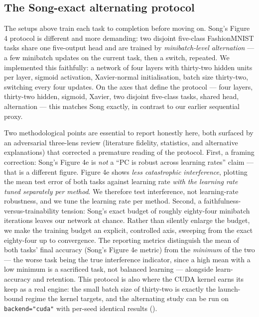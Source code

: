 \subsection{The Song-exact alternating protocol}

The setups above train each task to completion before moving on. Song's Figure 4 protocol is different
and more demanding: two disjoint five-class FashionMNIST tasks share one five-output head and are
trained by \emph{minibatch-level alternation} --- a few minibatch updates on the current task, then a
switch, repeated. We implemented this faithfully: a network of four layers with thirty-two hidden units
per layer, sigmoid activation, Xavier-normal initialisation, batch size thirty-two, switching every four
updates. On the axes that define the protocol --- four layers, thirty-two hidden, sigmoid, Xavier, two
disjoint five-class tasks, shared head, alternation --- this matches Song exactly, in contrast to our
earlier sequential proxy.

Two methodological points are essential to report honestly here, both surfaced by an adversarial
three-lens review (literature fidelity, statistics, and alternative explanations) that corrected a
premature reading of the protocol. First, a framing correction: Song's Figure 4e is \emph{not} a
``PC is robust across learning rates'' claim --- that is a different figure. Figure 4e shows \emph{less
catastrophic interference}, plotting the mean test error of both tasks against learning rate \emph{with
the learning rate tuned separately per method}. We therefore test interference, not learning-rate
robustness, and we tune the learning rate per method. Second, a faithfulness-versus-trainability
tension: Song's exact budget of roughly eighty-four minibatch iterations leaves our network at chance.
Rather than silently enlarge the budget, we make the training budget an explicit, controlled axis,
sweeping from the exact eighty-four up to convergence. The reporting metrics distinguish the mean of
both tasks' final accuracy (Song's Figure 4e metric) from the \emph{minimum} of the two --- the worse
task being the true interference indicator, since a high mean with a low minimum is a sacrificed task,
not balanced learning --- alongside learn-accuracy and retention. This protocol is also where the CUDA
kernel earns its keep as a real engine: the small batch size of thirty-two is exactly the launch-bound
regime the kernel targets, and the alternating study can be run on \texttt{backend="cuda"} with per-seed
identical results ().

